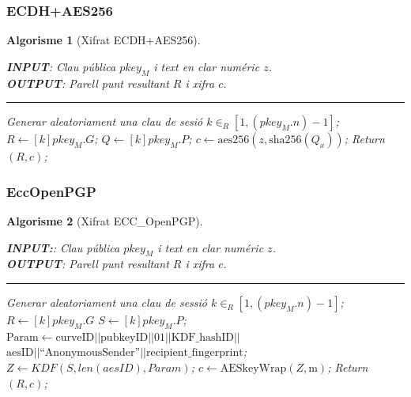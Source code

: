 \documentclass{beamer}
\theoremstyle{saltolinea}   			%
\newtheorem{algo}{Algorisme}
\begin{document}
\subsubsection{ECDH+AES256}

\begin{frame}
  \begin{algo}[Xifrat ECDH+AES256]\label{alg:ecdhAES256}
    \parbox[b]{\linewidth}{%
      {\bf INPUT}: Clau p\'ublica $pkey_{M}$ i text en clar num\'eric $z$.\\
      {\bf OUTPUT}: Parell punt resultant $R$ i xifra $c$.
      \hrule
    }%
    \vspace{-7mm}
    \begin{algorithmic}[1]
      \STATE Generar aleatoriament una clau de sesi\'o $k\in_{R}\left[1,\left(pkey_{M}.n\right)-1\right]$;
      \STATE $R \leftarrow \left[k\right] pkey_{M}.G$;
      \STATE $Q \leftarrow \left[k\right] pkey_{M}.P$; %
      \STATE \alert<2>{$c \leftarrow \textrm{aes256}(z,\textrm{sha256}(Q_x))$;}
      \STATE Return $(R,c)$;
    \end{algorithmic}
  \end{algo}
\end{frame}

\subsubsection{EccOpenPGP}

\begin{frame}
  \begin{algo}[Xifrat ECC\_OpenPGP]\label{alg:eccOpenPGP}
    \parbox[b]{\linewidth}{%
      {\bf INPUT:}: Clau p\'ublica $pkey_{M}$ i text en clar num\'eric $z$.\\
      {\bf OUTPUT}: Parell punt resultant $R$ i xifra $c$.
      \hrule
    }%
    \vspace{-7mm}
    \begin{algorithmic}[1]
      \STATE Generar aleatoriament una clau de sessi\'o $k\in_{R}\left[1,\left(pkey_{M}.n\right)-1\right]$;
      \STATE $R \leftarrow \left[k\right] pkey_{M}.G$
      \STATE $S \leftarrow \left[k\right] pkey_{M}.P$; 
      \STATE $\textrm{Param}  \leftarrow \textrm{curveID} || \textrm{pubkeyID} || 01 || \textrm{KDF\_hashID} || $\\$ \textrm{aesID} || \textrm{``AnonymousSender''} || \textrm{recipient\_fingerprint}$;
      \STATE \alert<2>{$Z \leftarrow KDF\left(S,len\left(aesID\right),Param\right)$;\label{alg:eccOpenPGP:kdf}}
      \STATE \alert<3>{$c \leftarrow \textrm{AESkeyWrap}\left(Z,\textrm{m}\right)$;}
      \STATE Return $(R,c)$;
    \end{algorithmic}
  \end{algo}
\end{frame}
\end{document}

